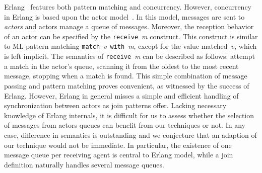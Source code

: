\documentclass{LMCS}
\newcommand{\erlang}{\textrm{Erlang}\xspace}
\renewcommand{\_}{\mathord{\rule[-.25ex]{1ex}{.15ex}}}
\begin{document}
\erlang~\cite{Erlang} features both pattern matching and concurrency.
However, concurrency in Erlang is based upon the actor
model~\cite{actor73,actor86}. In this model, messages are sent to
\emph{actors} and actors manage a queue of messages.
Moreover, the
reception behavior of an actor can be specified by
the  \texttt{receive}~\textit{m} construct.
This construct is similar to ML pattern matching
\texttt{match}~\textit{v}~\texttt{with}~\textit{m}, except for the
value matched~$v$, which is left implicit.
The semantics of \texttt{receive}~\textit{m}
can be described as follows: attempt a match in the actor's queue,
scanning it from the oldest to the most
recent message, stopping when a match is found.
This simple combination of message passing and pattern
matching proves convenient, as witnessed by the success of Erlang.
However, \erlang in general misses a simple and efficient handling of
synchronization between actors as join patterns offer. Lacking
necessary knowledge of \erlang internals, it is difficult for us to
assess whether the selection of messages from actors queues can
benefit from our techniques or not. In any case, difference in
semantics is outstanding and we conjecture that an adaption of our
technique would not be immediate. In particular, the existence of one
message queue per receiving agent is central to \erlang model, while a
join definition naturally handles several message queues.
\end{document}
